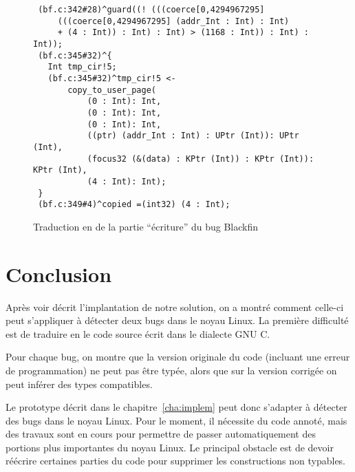 \begin{figure}[h]
\begin{Verbatim}
 (bf.c:342#28)^guard((! (((coerce[0,4294967295]
     (((coerce[0,4294967295] (addr_Int : Int) : Int)
     + (4 : Int)) : Int) : Int) > (1168 : Int)) : Int) : Int));
 (bf.c:345#32)^{
   Int tmp_cir!5;
   (bf.c:345#32)^tmp_cir!5 <-
       copy_to_user_page(
           (0 : Int): Int,
           (0 : Int): Int,
           (0 : Int): Int,
           ((ptr) (addr_Int : Int) : UPtr (Int)): UPtr (Int),
           (focus32 (&(data) : KPtr (Int)) : KPtr (Int)): KPtr (Int),
           (4 : Int): Int);
 }
 (bf.c:349#4)^copied =(int32) (4 : Int);
\end{Verbatim}
\caption{Traduction en \newspeak de la partie \enquote{écriture} du bug Blackfin}
\label{fig:black-npk2}
\end{figure}

\section*{Conclusion}

Après voir décrit l'implantation de notre solution, on a montré comment celle-ci
peut s'appliquer à détecter deux bugs dans le noyau Linux. La première difficulté
est de traduire en \newspeak le code source écrit dans le dialecte GNU C.

Pour chaque bug, on montre que la version originale du code (incluant une erreur
de programmation) ne peut pas être typée, alors que sur la version corrigée on
peut inférer des types compatibles.

Le prototype décrit dans le chapitre~\ref{cha:implem} peut donc s'adapter à
détecter des bugs dans le noyau Linux. Pour le moment, il nécessite du code
annoté, mais des travaux sont en cours pour permettre de passer automatiquement
des portions plus importantes du noyau Linux. Le principal obstacle est de
devoir réécrire certaines parties du code pour supprimer les constructions non
typables.

